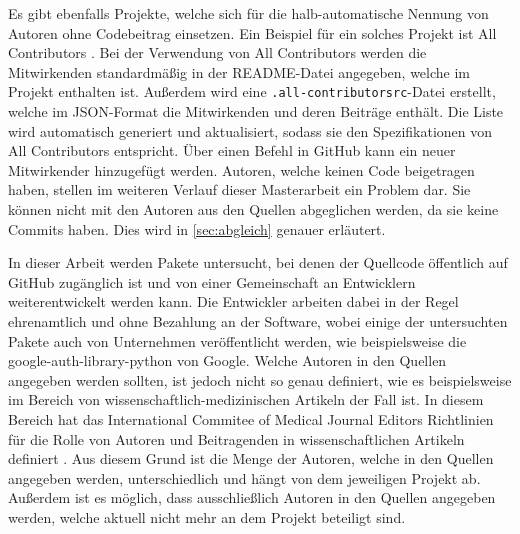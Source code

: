 Es gibt ebenfalls Projekte, welche sich für die halb-automatische Nennung von Autoren ohne Codebeitrag einsetzen.
Ein Beispiel für ein solches Projekt ist \glqq All Contributors\grqq{} \autocite{bolam_recognize_2024}.
Bei der Verwendung von \glqq All Contributors\grqq{} werden die Mitwirkenden standardmäßig in der README-Datei angegeben, welche im Projekt enthalten ist.
Außerdem wird eine \texttt{.all-contributorsrc}-Datei erstellt, welche im JSON-Format die Mitwirkenden und deren Beiträge enthält.
Die Liste wird automatisch generiert und aktualisiert, sodass sie den Spezifikationen von \glqq All Contributors\grqq{} entspricht.
Über einen Befehl in GitHub kann ein neuer Mitwirkender hinzugefügt werden.
Autoren, welche keinen Code beigetragen haben, stellen im weiteren Verlauf dieser Masterarbeit ein Problem dar.
Sie können nicht mit den Autoren aus den Quellen abgeglichen werden, da sie keine Commits haben.
Dies wird in \autoref{sec:abgleich} genauer erläutert.

In dieser Arbeit werden Pakete untersucht, bei denen der Quellcode öffentlich auf GitHub zugänglich ist und von einer Gemeinschaft an Entwicklern weiterentwickelt werden kann.
Die Entwickler arbeiten dabei in der Regel ehrenamtlich und ohne Bezahlung an der Software, wobei einige der untersuchten Pakete auch von Unternehmen veröffentlicht werden, wie beispielsweise die \glqq google-auth-library-python\grqq{} von Google.
Welche Autoren in den Quellen angegeben werden sollten, ist jedoch nicht so genau definiert, wie es beispielsweise im Bereich von wissenschaftlich-medizinischen Artikeln der Fall ist.
In diesem Bereich hat das \glqq International Commitee of Medical Journal Editors\grqq{} Richtlinien für die Rolle von Autoren und Beitragenden in wissenschaftlichen Artikeln definiert \autocite{icmje_icmje_2024}.
Aus diesem Grund ist die Menge der Autoren, welche in den Quellen angegeben werden, unterschiedlich und hängt von dem jeweiligen Projekt ab.
Außerdem ist es möglich, dass ausschließlich Autoren in den Quellen angegeben werden, welche aktuell nicht mehr an dem Projekt beteiligt sind.
